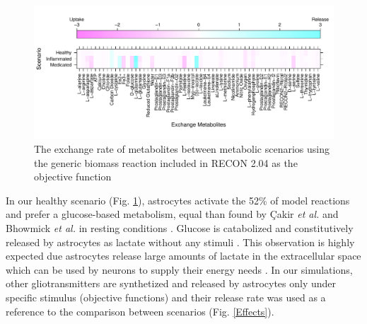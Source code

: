 \begin{figure}[h]
\begin{center}
\includegraphics[width=\textwidth]{neuroprotective/Exchanges}
\end{center}
\caption{The exchange rate of metabolites between metabolic scenarios using the generic biomass reaction included in RECON 2.04 as the objective function}
\label{Exchanges}
\end{figure}

In our healthy scenario (Fig. \ref{Exchanges}), astrocytes activate the 52\% of model reactions and prefer a glucose-based metabolism, equal than found by Çakir \emph{et al.} and Bhowmick \emph{et al.} in resting conditions \cite{Cakir2007,Bhowmick2015}. Glucose is catabolized and constitutively released by astrocytes as lactate without any stimuli \cite{LeFoll2016}. This observation is highly expected due astrocytes release large amounts of lactate in the extracellular space which can be used by neurons to supply their energy needs \cite{Allaman2011}.  In our simulations, other gliotransmitters are synthetized and released by astrocytes only under specific stimulus (objective functions) and their release rate was used as a reference to the comparison between scenarios (Fig. \ref{Effects}).


